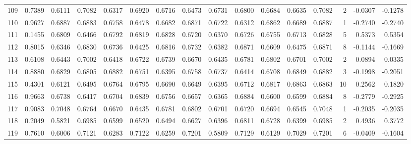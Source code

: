 \begin{tabular}{lrrrrrrrrrrrrrrr}
109 &      0.7389 &  0.6111 &  0.7082 &  0.6317 &  0.6920 &  0.6716 &  0.6473 &  0.6731 &  0.6800 &  0.6684 &   0.6635 &     0.7082 &      2 &                   -0.0307 &                    -0.1278 \\
110 &      0.9627 &  0.6887 &  0.6883 &  0.6758 &  0.6478 &  0.6682 &  0.6871 &  0.6722 &  0.6312 &  0.6862 &   0.6689 &     0.6887 &      1 &                   -0.2740 &                    -0.2740 \\
111 &      0.1455 &  0.6809 &  0.6466 &  0.6792 &  0.6819 &  0.6828 &  0.6720 &  0.6370 &  0.6726 &  0.6755 &   0.6713 &     0.6828 &      5 &                    0.5373 &                     0.5354 \\
112 &      0.8015 &  0.6346 &  0.6830 &  0.6736 &  0.6425 &  0.6816 &  0.6732 &  0.6382 &  0.6871 &  0.6609 &   0.6475 &     0.6871 &      8 &                   -0.1144 &                    -0.1669 \\
113 &      0.6108 &  0.6443 &  0.7002 &  0.6418 &  0.6722 &  0.6739 &  0.6670 &  0.6435 &  0.6781 &  0.6802 &   0.6701 &     0.7002 &      2 &                    0.0894 &                     0.0335 \\
114 &      0.8880 &  0.6829 &  0.6805 &  0.6882 &  0.6751 &  0.6395 &  0.6758 &  0.6737 &  0.6414 &  0.6708 &   0.6849 &     0.6882 &      3 &                   -0.1998 &                    -0.2051 \\
115 &      0.4301 &  0.6121 &  0.6495 &  0.6764 &  0.6795 &  0.6690 &  0.6649 &  0.6395 &  0.6712 &  0.6817 &   0.6863 &     0.6863 &     10 &                    0.2562 &                     0.1820 \\
116 &      0.9663 &  0.6738 &  0.6417 &  0.6704 &  0.6839 &  0.6756 &  0.6657 &  0.6365 &  0.6884 &  0.6600 &   0.6599 &     0.6884 &      8 &                   -0.2779 &                    -0.2925 \\
117 &      0.9083 &  0.7048 &  0.6764 &  0.6670 &  0.6435 &  0.6781 &  0.6802 &  0.6701 &  0.6720 &  0.6694 &   0.6545 &     0.7048 &      1 &                   -0.2035 &                    -0.2035 \\
118 &      0.2049 &  0.5821 &  0.6985 &  0.6599 &  0.6520 &  0.6494 &  0.6627 &  0.6396 &  0.6811 &  0.6728 &   0.6399 &     0.6985 &      2 &                    0.4936 &                     0.3772 \\
119 &      0.7610 &  0.6006 &  0.7121 &  0.6283 &  0.7122 &  0.6259 &  0.7201 &  0.5809 &  0.7129 &  0.6129 &   0.7029 &     0.7201 &      6 &                   -0.0409 &                    -0.1604 \\

\end{tabular}
